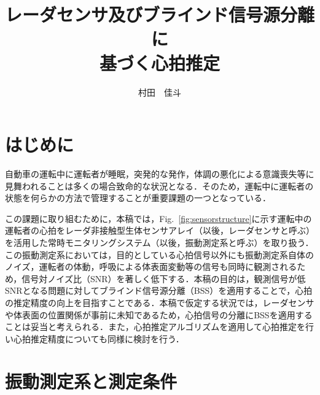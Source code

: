 \documentclass[a4j]{jsarticle}
\title{レーダセンサ及びブラインド信号源分離に\\基づく心拍推定}
\author{村田　佳斗}
\begin{document}
\maketitle%



\thispagestyle{empty}
\pagestyle{empty}

\section{はじめに}

自動車の運転中に運転者が睡眠，突発的な発作，体調の悪化による意識喪失等に見舞われることは多くの場合致命的な状況となる．そのため，運転中に運転者の状態を何らかの方法で管理することが重要課題の一つとなっている．

この課題に取り組むために，本稿では，Fig.~\ref{fig:sensorstructure}に示す運転中の運転者の心拍をレーダ非接触型生体センサアレイ（以後，レーダセンサと呼ぶ）を活用した常時モニタリングシステム（以後，振動測定系と呼ぶ）を取り扱う．この振動測定系においては，目的としている心拍信号以外にも振動測定系自体のノイズ，運転者の体動，呼吸による体表面変動等の信号も同時に観測されるため，信号対ノイズ比（SNR）を著しく低下する．本稿の目的は，観測信号が低SNRとなる問題に対してブラインド信号源分離（BSS）\cite{originica}を適用することで，心拍の推定精度の向上を目指すことである．本稿で仮定する状況では，レーダセンサや体表面の位置関係が事前に未知であるため，心拍信号の分離にBSSを適用することは妥当と考えられる．また，心拍推定アルゴリズムを適用して心拍推定を行い心拍推定精度についても同様に検討を行う．

\section{振動測定系と測定条件}
\end{document}
